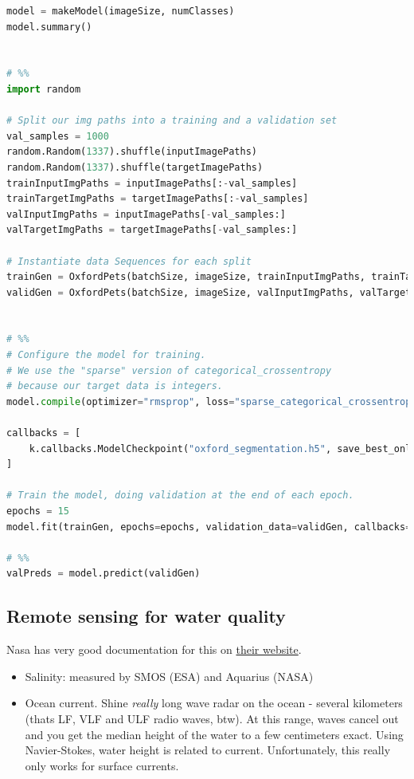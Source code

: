 \begin{lstlisting}[language=python]
model = makeModel(imageSize, numClasses)
model.summary()


# %%
import random

# Split our img paths into a training and a validation set
val_samples = 1000
random.Random(1337).shuffle(inputImagePaths)
random.Random(1337).shuffle(targetImagePaths)
trainInputImgPaths = inputImagePaths[:-val_samples]
trainTargetImgPaths = targetImagePaths[:-val_samples]
valInputImgPaths = inputImagePaths[-val_samples:]
valTargetImgPaths = targetImagePaths[-val_samples:]

# Instantiate data Sequences for each split
trainGen = OxfordPets(batchSize, imageSize, trainInputImgPaths, trainTargetImgPaths)
validGen = OxfordPets(batchSize, imageSize, valInputImgPaths, valTargetImgPaths)


# %%
# Configure the model for training.
# We use the "sparse" version of categorical_crossentropy
# because our target data is integers.
model.compile(optimizer="rmsprop", loss="sparse_categorical_crossentropy")

callbacks = [
    k.callbacks.ModelCheckpoint("oxford_segmentation.h5", save_best_only=True)
]

# Train the model, doing validation at the end of each epoch.
epochs = 15
model.fit(trainGen, epochs=epochs, validation_data=validGen, callbacks=callbacks)

# %%
valPreds = model.predict(validGen)

\end{lstlisting}


\subsection{Remote sensing for water quality}
Nasa has very good documentation for this on \href{https://earthdata.nasa.gov/learn/pathfinders/water-quality-data-pathfinder}{their website}.

\begin{itemize}
    \item Salinity: measured by SMOS (ESA) and Aquarius (NASA)
    \item Ocean current. Shine \emph{really} long wave radar on the ocean - several kilometers (thats LF, VLF and ULF radio waves, btw). At this range, waves cancel out and you get the median height of the water to a few centimeters exact. Using Navier-Stokes, water height is related to current. Unfortunately, this really only works for surface currents.
\end{itemize}

